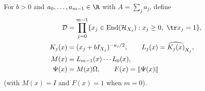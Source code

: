 \begin{definition}
    \label{def:peps_regularized_patch_objective}
    \leanok
    For $b>0$ and $a_0,\ldots,a_{m-1}\in\R$ with $A=\sum_j a_j$, define
    \begin{align}
        \mathcal D & =\prod_{j=0}^{m-1}
        \{x_j\in\operatorname{End}(\mathcal H_{X_j}):x_j\ge0,\ \tr x_j=1\},         \notag \\
        K_j(x)     & =(x_j+bI_{X_j})^{-a_j/2},\qquad L_j(x)=\widehat{K_j(x)}_{X_j}, \notag \\
        M(x)       & =L_{m-1}(x)\cdots L_0(x),                                      \notag \\
        \Psi(x)    & =M(x)\Omega,\qquad F(x)=\|\Psi(x)\|
        \label{eq:peps_regularized_patch_objective}
    \end{align}
    (with $M(x)=I$ and $F(x)=1$ when $m=0$).


\end{definition}

